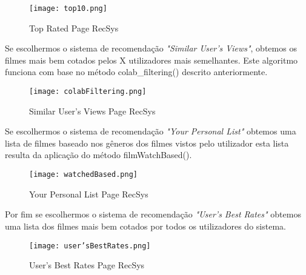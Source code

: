 \begin{figure}[H]
\centering
\texttt{[image: top10.png]}
\caption {Top Rated Page RecSys}
\label {fig14}
\end{figure}

Se escolhermos o sistema de recomendação \textit{"Similar User's Views"}, obtemos os filmes mais bem cotados pelos X utilizadores mais semelhantes. Este algoritmo funciona com base no método colab\_filtering() descrito anteriormente.\newline

\begin{figure}[H]
\centering
\texttt{[image: colabFiltering.png]}
\caption {Similar User's Views Page RecSys}
\label {fig15}
\end{figure}

Se escolhermos o sistema de recomendação \textit{"Your Personal List"} obtemos uma lista de filmes baseado nos gêneros dos filmes vistos pelo utilizador esta lista resulta da aplicação do método filmWatchBased().\newline

\begin{figure}[H]
\centering
\texttt{[image: watchedBased.png]}
\caption {Your Personal List Page RecSys}
\label {fig16}
\end{figure}

Por fim se escolhermos o sistema de recomendação \textit{"User's Best Rates"} obtemos uma lista dos filmes mais bem cotados por todos os utilizadores do sistema.\newline

\begin{figure}[H]
\centering
\texttt{[image: user'sBestRates.png]}
\caption {User's Best Rates Page RecSys}
\label {fig17}
\end{figure}

\newpage